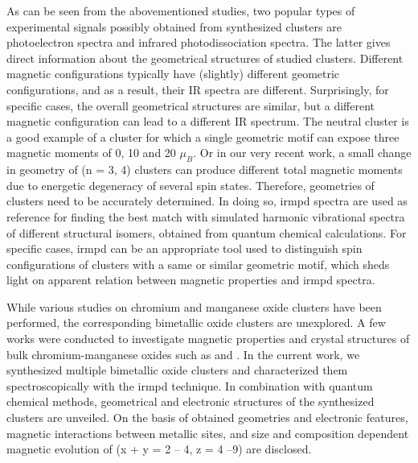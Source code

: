 \begin{refsection}
As can be seen from the abovementioned studies, two popular types of experimental signals possibly obtained from synthesized clusters are photoelectron spectra and infrared photodissociation spectra. The latter gives direct information about the geometrical structures of studied clusters. Different magnetic configurations typically have (slightly) different geometric configurations, and as a result, their IR spectra are different. Surprisingly, for specific cases, the overall geometrical structures are similar, but a different magnetic configuration can lead to a different IR spectrum. The neutral  cluster is a good example of a cluster for which a single geometric motif can expose three magnetic moments of 0, 10 and 20 $\mu_B$. \cite{fe4o6Ding, fe4o6Kirilyuk, fe4o6Logemann, fe4o6Erlebach} Or in our very recent work, a small change in geometry of  (n = 3, 4) clusters can produce different total magnetic moments due to energetic degeneracy of several spin states. \cite{Meyei18} Therefore, geometries of clusters need to be accurately determined. In doing so, \acrshort{irmpd} spectra are used as reference for finding the best match with simulated harmonic vibrational spectra of different structural isomers, obtained from quantum chemical calculations. \cite{fe4o6Logemann, Janssens01, Sant2008, Mathias03, Asmis07, Nhan18, Dijk14}  For specific cases, \acrshort{irmpd} can be an appropriate tool used to distinguish spin configurations of clusters with a same or similar geometric motif, \cite{Nhan18} which sheds light on apparent relation between magnetic properties and \acrshort{irmpd} spectra.   



While various studies on chromium and manganese oxide clusters have been performed, the corresponding bimetallic oxide clusters are unexplored. A few works were conducted to investigate magnetic properties and crystal structures of bulk chromium-manganese oxides such as  and . \cite{Nalbandyan13, Chamberland77} In the current work, we synthesized multiple bimetallic oxide clusters and characterized them spectroscopically with the \acrshort{irmpd} technique. In combination with quantum chemical methods, geometrical and electronic structures of the synthesized clusters are unveiled. On the basis of obtained geometries and electronic features, magnetic interactions between metallic sites, and size and composition dependent magnetic evolution of  (x + y = 2 -- 4, z = 4 --9) are disclosed.  







\end{refsection}
